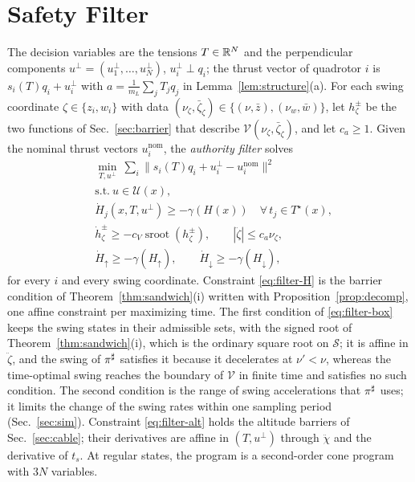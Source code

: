 \section{Safety Filter}\label{sec:filter}

The decision variables are the tensions $T\in\mathbb{R}^N$ and the perpendicular components $u^\perp=(u_1^\perp,\dots,u_N^\perp)$, $u_i^\perp\perp q_i$; the thrust vector of quadrotor $i$ is $s_i(T)q_i+u_i^\perp$ with $a=\frac{1}{m_L}\sum_jT_jq_j$ in Lemma~\ref{lem:structure}(a). For each swing coordinate $\zeta\in\{z_i,w_i\}$ with data $(\nu_\zeta,\bar\zeta_\zeta)\in\{(\nu,\bar z),(\nu_w,\bar w)\}$, let $h^{\pm}_\zeta$ be the two functions of Sec.~\ref{sec:barrier} that describe $\mathcal{V}(\nu_\zeta,\bar\zeta_\zeta)$, and let $c_a\ge1$. Given the nominal thrust vectors $u_i^{\mathrm{nom}}$, the \emph{authority filter} solves
\begin{subequations}\label{eq:filter}
\begin{align}
&\min_{T,u^\perp}\ \textstyle\sum_i\|s_i(T)q_i+u_i^\perp-u_i^{\mathrm{nom}}\|^2 \\
&\text{s.t.}\  u\in\mathcal{U}(x), \label{eq:filter-thrust}\\
& \dot H_j(x,T,u^\perp)\ge-\gamma(H(x))\quad \forall\,t_j\in T^\star(x), \label{eq:filter-H}\\
& \dot h^{\pm}_\zeta\ge-c_V\operatorname{sroot}(h^{\pm}_\zeta),\qquad |\ddot\zeta|\le c_a\nu_\zeta, \label{eq:filter-box}\\
& \dot H_\uparrow\ge-\gamma(H_\uparrow),\qquad \dot H_\downarrow\ge-\gamma(H_\downarrow), \label{eq:filter-alt}
\end{align}
\end{subequations}
for every $i$ and every swing coordinate. Constraint \eqref{eq:filter-H} is the barrier condition of Theorem~\ref{thm:sandwich}(i) written with Proposition~\ref{prop:decomp}, one affine constraint per maximizing time. The first condition of \eqref{eq:filter-box} keeps the swing states in their admissible sets, with the signed root of Theorem~\ref{thm:sandwich}(i), which is the ordinary square root on $\mathcal S$; it is affine in $\ddot\zeta$, and the swing of $\pi^{\sharp}$ satisfies it because it decelerates at $\nu'<\nu$, whereas the time-optimal swing reaches the boundary of $\mathcal V$ in finite time and satisfies no such condition. The second condition is the range of swing accelerations that $\pi^{\sharp}$ uses; it limits the change of the swing rates within one sampling period (Sec.~\ref{sec:sim}). Constraint \eqref{eq:filter-alt} holds the altitude barriers of Sec.~\ref{sec:cable}; their derivatives are affine in $(T,u^\perp)$ through $\ddot\chi$ and the derivative of $t_s$. At regular states, the program is a second-order cone program with $3N$ variables.

